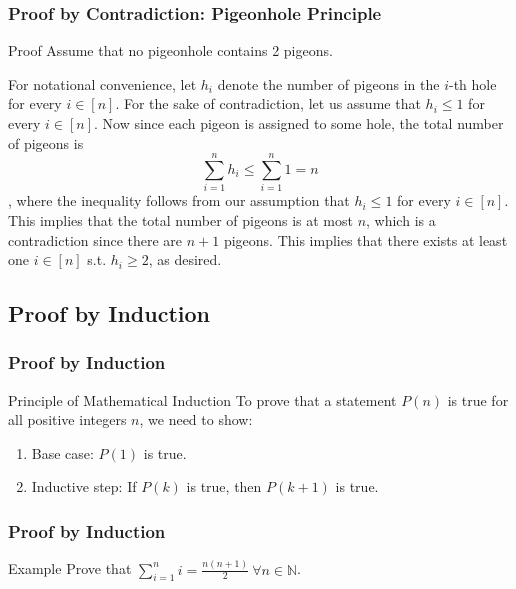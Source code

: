 \documentclass[t]{beamer}
\begin{document}
            \begin{frame}
                \frametitle{Proof by Contradiction: Pigeonhole Principle }
                \begin{block}{Proof}
                    Assume that no pigeonhole contains 2 pigeons.

                    \bigskip
                    For notational convenience, let $h_i$ denote the number of pigeons in the $i$-th hole for every $i \in [n]$. For the sake of contradiction, 
                    let us assume that $h_i \leq 1$ for every $i \in [n]$. Now since each pigeon is assigned to some hole, 
                    the total number of pigeons is \[\sum_{i=1}^{n} h_i \leq \sum_{i=1}^{n} 1 = n\], where the inequality follows from our assumption that $h_i \leq 1$ for every $i \in [n]$. 
                    This implies that the total number of pigeons is at most $n$, which is a contradiction since there are $n+1$ pigeons. 
                    This implies that there exists at least one $i \in [n]$ s.t. $h_i \geq 2$, as desired.
                \end{block}
            \end{frame}

        \subsection{Proof by Induction}
            \begin{frame}
                \frametitle{Proof by Induction}
                \begin{block}{Principle of Mathematical Induction}
                    To prove that a statement $P(n)$ is true for all positive integers $n$, we need to show:
                    \begin{enumerate}
                        \item<1-> Base case: $P(1)$ is true.
                        \item<2-> Inductive step: If $P(k)$ is true, then $P(k+1)$ is true.
                    \end{enumerate}
                \end{block}
            \end{frame}

            \begin{frame}
                \frametitle{Proof by Induction}
                \begin{block}{Example}
                    Prove that $\sum_{i = 1}^{n} i = \frac{n(n+1)}{2}\ \forall n \in \mathbb{N}$.
                \end{block}
            \end{frame}
\end{document}
